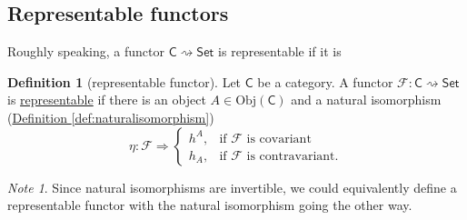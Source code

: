 \documentclass[a4paper,10pt]{scrreprt}
\newcommand{\defn}[1]{\ul{#1}}
\newcommand{\Obj}{\mathrm{Obj}}
\theoremstyle{definition}
\newtheorem{definition}{Definition}[section]
\theoremstyle{plain}
\theoremstyle{remark}
\newtheorem{note}{Note}[section]
\begin{document}
\subsection{Representable functors}
Roughly speaking, a functor $\mathsf{C} \rightsquigarrow \mathsf{Set}$ is representable if it is 

\begin{definition}[representable functor]
  \label{def:representablefunctor}
  Let $\mathsf{C}$ be a category. A functor $\mathcal{F}\colon \mathsf{C} \rightsquigarrow \mathsf{Set}$ is \defn{representable} if there is an object $A \in \Obj(\mathsf{C})$ and a natural isomorphism (\hyperref[def:naturalisomorphism]{Definition \ref*{def:naturalisomorphism}})
  \begin{equation*}
    \eta\colon \mathcal{F} \Rightarrow 
    \begin{cases}
      h^{A}, & \text{if $\mathcal{F}$ is covariant} \\
      h_{A}, & \text{if $\mathcal{F}$ is contravariant.}
    \end{cases}
  \end{equation*}
\end{definition}

\begin{note}
  Since natural isomorphisms are invertible, we could equivalently define a representable functor with the natural isomorphism going the other way.
\end{note}
\end{document}
